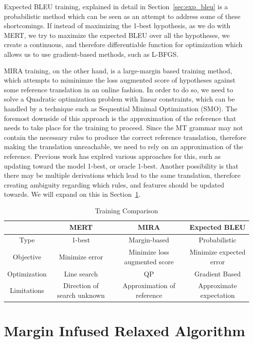 Expected BLEU training, explained in detail in Section~\ref{sec:exp_bleu} is a probabilistic method which can be seen as an attempt to address some of these shortcomings. If instead of maximizing the 1-best hypothesis, as we do with MERT, we try to maximize the expected BLEU over all the hypotheses, we create a continuous, and therefore differentiable function for optimization which allows us to use gradient-based methods, such as L-BFGS. 

MIRA training, on the other hand, is a large-margin based training method, which attempts to miminimze the loss augmented score of hypotheses against some reference translation in an online fashion. In order to do so, we need to solve a Quadratic optimization problem with linear constraints, which can be handled by a technique such as Sequential Minimal Optimization (SMO). The foremost downside of this approach is the approximation of the reference that needs to take place for the training to proceed. Since the MT grammar may not contain the necessary rules to produce the correct reference translation, therefore making the translation unreachable, we need to rely on an approximation of the reference. Previous work has explred various approaches for this, such as updating toward the model 1-best, or oracle 1-best. Another possibility is that there may be multiple derivations which lead to the same translation, therefore creating ambiguity regarding which rules, and features should be updated towards. We will expand on this in Section~\ref{sec:mira}.

\begin{table}[htb]
	\centering
		\begin{tabular}{|c|c|c|c|} 
			& MERT & MIRA & Expected BLEU \\ \hline
			Type & 1-best & Margin-based & Probabilistic \\ \hline
			Objective & Minimize error & Minimize loss augmented score & Minimize expected error \\ \hline
			Optimization & Line search & QP & Gradient Based \\ \hline
			Limitations & Direction of search unknown & Approximation of reference & Approximate expectation \\ \hline
		\end{tabular}
	\caption{Training Comparison}
	\label{tab:TrainingComparison}
\end{table}

\section{Margin Infused Relaxed Algorithm}
\label{sec:mira}

